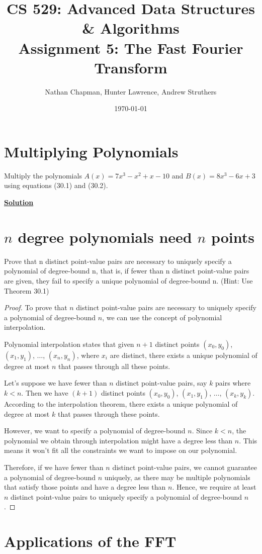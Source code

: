 \documentclass{article}
\title{\vspace*{-0.625in}CS 529: Advanced Data Structures \& Algorithms \\ Assignment 5: The Fast Fourier Transform}
\author{Nathan Chapman, Hunter Lawrence, Andrew Struthers}
\date{\today}
\renewcommand{\_}{\ifincsname_\else\legacyunderscore\fi}
\begin{document}
    \maketitle

    \section*{Multiplying Polynomials}

        Multiply the polynomials $A(x) = 7 x^3 - x^2 + x - 10$ and $B(x) = 8x^3 - 6x + 3$ using equations (30.1) and (30.2).

        \underline{\textbf{Solution}}

        
        


    \section*{$n$ degree polynomials need $n$ points}

        Prove that n distinct point-value pairs are necessary to uniquely specify a polynomial of degree-bound n, that is, if fewer than n distinct point-value pairs are given, they fail to specify a unique polynomial of degree-bound n. (Hint: Use Theorem 30.1)

\begin{proof}
To prove that $n$ distinct point-value pairs are necessary to uniquely specify a polynomial of degree-bound $n$, we can use the concept of polynomial interpolation.

Polynomial interpolation states that given $n+1$ distinct points $(x_0, y_0)$, $(x_1, y_1)$, $\hdots$, $(x_n, y_n)$, where $x_i$ are distinct, there exists a unique polynomial of degree at most $n$ that passes through all these points.

Let's suppose we have fewer than $n$ distinct point-value pairs, say $k$ pairs where $k < n$. Then we have $(k+1)$ distinct points $(x_0, y_0)$, $(x_1, y_1)$, $\hdots$, $(x_k, y_k)$. According to the interpolation theorem, there exists a unique polynomial of degree at most $k$ that passes through these points.

However, we want to specify a polynomial of degree-bound $n$. Since $k < n$, the polynomial we obtain through interpolation might have a degree less than $n$. This means it won't fit all the constraints we want to impose on our polynomial.

Therefore, if we have fewer than $n$ distinct point-value pairs, we cannot guarantee a polynomial of degree-bound $n$ uniquely, as there may be multiple polynomials that satisfy those points and have a degree less than $n$. Hence, we require at least $n$ distinct point-value pairs to uniquely specify a polynomial of degree-bound $n$.
\end{proof}

    \section*{Applications of the FFT}

\printbibliography
\end{document}
